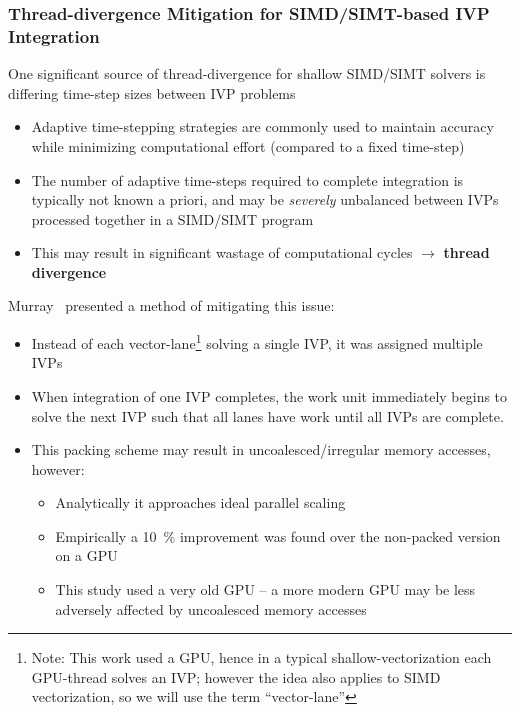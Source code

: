 \documentclass{beamer}
\begin{document}
\begin{frame}
 \frametitle{Thread-divergence Mitigation for SIMD\slash SIMT-based IVP Integration}
 {
 One significant source of thread-divergence for shallow SIMD\slash SIMT solvers is differing time-step sizes between IVP problems
 \begin{itemize}
   \item Adaptive time-stepping strategies are commonly used to maintain accuracy while minimizing computational effort (compared to a fixed time-step)
   \item The number of adaptive time-steps required to complete integration is typically not known a priori, and may be \textit{severely} unbalanced between IVPs processed together in a SIMD\slash SIMT program
    \item This may result in significant wastage of computational cycles $\rightarrow$ \textbf{thread divergence}
 \end{itemize}
 }
 {
  Murray~ presented a method of mitigating this issue:
  \begin{itemize}
    \item Instead of each vector-lane\footnote{Note: This work used a GPU, hence in a typical shallow-vectorization each GPU-thread solves an IVP; however the idea also applies to SIMD vectorization, so we will use the term ``vector-lane''} solving a single IVP, it was assigned multiple IVPs
    \item When integration of one IVP completes, the work unit immediately begins to solve the next IVP such that all lanes have work until all IVPs are complete.
    \item This packing scheme may result in uncoalesced\slash irregular memory accesses, however:
    \begin{itemize}
     \item Analytically it approaches ideal parallel scaling
     \item Empirically a \SI{10}{\percent} improvement  was found over the non-packed version on a GPU
     \item This study used a very old GPU -- a more modern GPU may be less adversely affected by uncoalesced memory accesses
    \end{itemize}
  \end{itemize}
 }
\end{frame}
\end{document}
